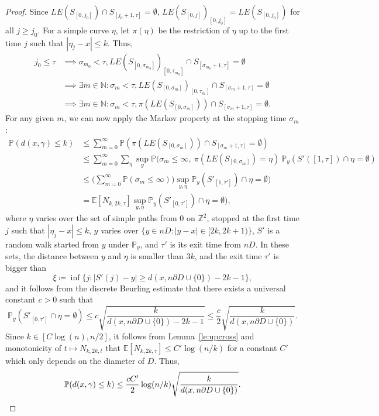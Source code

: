 \documentclass[11pt]{article}
\begin{document}
\begin{proof}
  Since  $LE(S_{[0,j_0]})\cap S_{[j_0+1,\tau]} =\emptyset$,
  $LE(S_{[0,j]} )_{[0,j_0]}=LE(S_{[0,j_0]})$
  for all $j\geq j_0$.
  For a simple curve $\eta$, let $\pi(\eta)$ be the restriction of $\eta$ up to the first time $j$ such that $|\eta_j-x|\leq k$.
    Thus,
  \begin{align*}
j_0\leq \tau&\implies \sigma_{m_0}<\tau,  LE(S_{[0,\sigma_{m_0} ]})_{[0,\tau_{m_0}]}\cap S_{[\sigma_{m_0}+1,\tau]} =\emptyset\\
&\implies \exists m\in \mathbb{N}: \sigma_m<\tau,
   LE(S_{[0,\sigma_{m} ]})_{[0,\tau_{m}]}\cap S_{[\sigma_{m}+1,\tau]} =\emptyset\\
&\implies    \exists m\in \mathbb{N}: \sigma_m<\tau,
   \pi(LE(S_{[0,\sigma_{m} ]})) \cap S_{[\sigma_{m}+1,\tau]} =\emptyset.
  \end{align*}
 For any given $m$, we can now apply the Markov property at the stopping time $\sigma_m$:
    \begin{align*}
    \mathbb{P}(   d(x,\gamma)\leq k  )    &\leq \sum_{m=0}^\infty \mathbb{P}( \pi(LE(S_{[0,\sigma_{m} ]}))\cap S_{[\sigma_{m}+1,\tau]} =\emptyset )\\
    &\leq \sum_{m=0}^\infty \sum_{ \eta } \sup_y \mathbb{P}( \sigma_m\leq  \infty,\  \pi(LE(S_{[0,\sigma_{m} ]}) =\eta)\ \mathbb{P}_{y}(  S'( [1, \tau ] )\cap  \eta =\emptyset ) \\
    &\leq \Big(\sum_{m=0}^\infty \mathbb{P}( \sigma_m\leq  \infty)\Big)  \sup_{y,\eta} \mathbb{P}_{y}(  S'_{[1, \tau' ]} )\cap  \eta =\emptyset )\\
    &=	\mathbb{E}[N_{k,2k,\tau} ] \sup_{y,\eta} \mathbb{P}_{y}(  S'_{[0, \tau' ]} )\cap \eta =\emptyset  )	,
    \end{align*}
    where $\eta$ varies over the set of simple paths from $0$ on $\mathbb{Z}^2$, stopped at
    the first time $j$ such that $|\eta_j-x|\leq k$, $y$ varies over $\{ y\in n D: |y-x|\in [2k,2k +1)  \}$, $S'$ is a random walk started from $y$ under $\mathbb{P}_y$, and $\tau'$ is its exit time from $nD$.
    In these sets, the distance between $y$ and $\eta$ is smaller than $3k$, and the exit time $\tau'$ is bigger than
    \[
    \xi\coloneqq \inf\{j: |S'(j)-y|\geq  d(x,n \partial D \cup \{0\})- 2k-1    \},
    \]
    and it follows from the discrete Beurling estimate \cite[Theorem 6.8.1]{LawlerLimic} that there exists a universal constant $c>0$ such that
    \[
    \mathbb{P}_y(  S'_{[0, \tau' ]}\cap  \eta =\emptyset  )\leq c \sqrt{\frac{k  }{ d(x,n \partial D \cup \{0\})- 2k -1}}\leq \frac{c}{2} \sqrt{\frac{k  }{d(x,n \partial D \cup \{0\}) }}.
    \]
    Since $k\in [C\log(n), n/2]$, it follows from Lemma~\ref{le:upcross} and monotonicity of $t\mapsto N_{k,2k,t}$ that $\mathbb{E}[N_{k,2k,\tau} ]\leq C'\log(n/k)$ for a constant $C'$ which only depends  on the diameter of $D$. Thus,
    \[
    \mathbb{P}( d(x,\gamma)\leq k)\leq \frac{cC'}{2} \log(n/k) \sqrt{\frac{k}{d(x,n \partial D \cup \{0\}) }  }. \qedhere
    \]
\end{proof}
\end{document}
